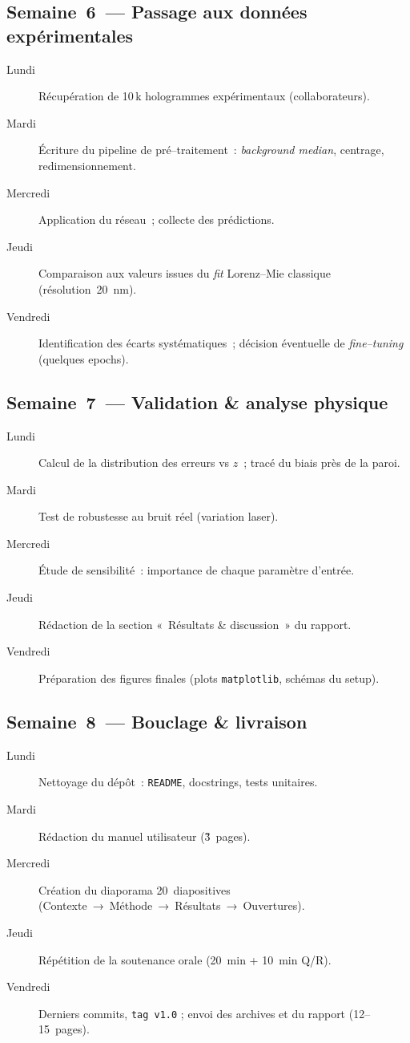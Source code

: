 \documentclass[11pt,a4paper]{article}
\begin{document}
\subsection*{Semaine 6 — Passage aux données expérimentales}
\begin{description}
  \item[Lundi] Récupération de 10\,k hologrammes expérimentaux (collaborateurs).
  \item[Mardi] Écriture du pipeline de pré--traitement : \emph{background median}, centrage, redimensionnement.
  \item[Mercredi] Application du réseau ; collecte des prédictions.
  \item[Jeudi] Comparaison aux valeurs issues du \emph{fit} Lorenz--Mie classique (résolution 20 nm).
  \item[Vendredi] Identification des écarts systématiques ; décision éventuelle de \emph{fine--tuning} (quelques 
  epochs).
\end{description}

\subsection*{Semaine 7 — Validation \& analyse physique}
\begin{description}
  \item[Lundi] Calcul de la distribution des erreurs vs $z$ ; tracé du biais près de la paroi.
  \item[Mardi] Test de robustesse au bruit réel (variation laser).
  \item[Mercredi] Étude de sensibilité : importance de chaque paramètre d'entrée.
  \item[Jeudi] Rédaction de la section « Résultats \& discussion » du rapport.
  \item[Vendredi] Préparation des figures finales (plots \texttt{matplotlib}, schémas du setup).
\end{description}

\subsection*{Semaine 8 — Bouclage \& livraison}
\begin{description}
  \item[Lundi] Nettoyage du dépôt : \texttt{README}, docstrings, tests unitaires.
  \item[Mardi] Rédaction du manuel utilisateur (\~3 pages).
  \item[Mercredi] Création du diaporama 20 diapositives (Contexte → Méthode → Résultats → Ouvertures).
  \item[Jeudi] Répétition de la soutenance orale (20 min + 10 min Q/R).
  \item[Vendredi] Derniers commits, \texttt{tag v1.0} ; envoi des archives et du rapport (12--15 pages).
\end{description}
\end{document}
